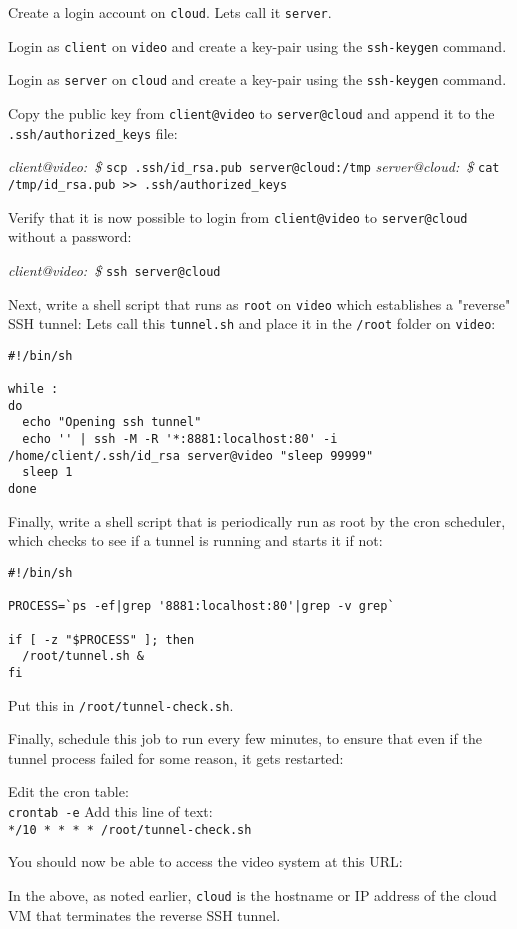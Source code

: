     \I Create a login account on \texttt{cloud}.  Lets call it
       \texttt{server}.

    \I Login as \texttt{client} on \texttt{video} and create a key-pair
       using the \texttt{ssh-keygen} command.

    \I Login as \texttt{server} on \texttt{cloud} and create a key-pair
       using the \texttt{ssh-keygen} command.

    \I Copy the public key from \texttt{client@video} to
       \texttt{server@cloud} and append it to the
       \texttt{.ssh/authorized\_keys} file:

       \BI
       \I \emph{client@video:~\$} \texttt{scp .ssh/id\_rsa.pub server@cloud:/tmp}
       \I \emph{server@cloud:~\$} \texttt{cat /tmp/id\_rsa.pub >> .ssh/authorized\_keys}
       \EI

    \I Verify that it is now possible to login from 
       \texttt{client@video} to
       \texttt{server@cloud} without a password:

       \BI
       \I \emph{client@video:~\$} \texttt{ssh server@cloud}
       \EI
    \EE

    Next, write a shell script that runs as \texttt{root} on
    \texttt{video} which establishes a "reverse" SSH tunnel: Lets call
    this \texttt{tunnel.sh} and place it in the \texttt{/root} folder
    on \texttt{video}:

    \begin{verbatim}
#!/bin/sh

while :
do
  echo "Opening ssh tunnel"
  echo '' | ssh -M -R '*:8881:localhost:80' -i /home/client/.ssh/id_rsa server@video "sleep 99999"
  sleep 1
done
    \end{verbatim}

    Finally, write a shell script that is periodically run as root
    by the cron scheduler, which checks to see if a tunnel is running
    and starts it if not:

    \begin{verbatim}
#!/bin/sh

PROCESS=`ps -ef|grep '8881:localhost:80'|grep -v grep`

if [ -z "$PROCESS" ]; then
  /root/tunnel.sh &
fi
    \end{verbatim}

    Put this in \texttt{/root/tunnel-check.sh}.

    Finally, schedule this job to run every few minutes, to ensure
    that even if the tunnel process failed for some reason, it gets
    restarted:

    \BI
    \I Edit the cron table:\\
       \texttt{crontab -e}
    \I Add this line of text:\\
       \texttt{*/10 * * * * /root/tunnel-check.sh}
    \EI

    You should now be able to access the video system at this URL:


    In the above, as noted earlier, \texttt{cloud} is the hostname or
    IP address of the cloud VM that terminates the reverse SSH tunnel.

